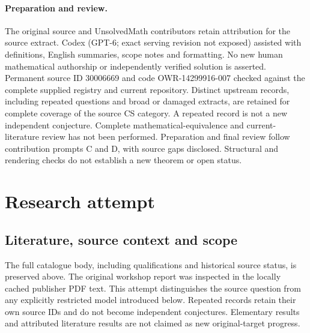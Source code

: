 \documentclass[11pt]{article}
\begin{document}
\paragraph{Preparation and review.}
The original source and UnsolvedMath contributors retain attribution for the source extract. Codex (GPT-6; exact serving revision not exposed) assisted with definitions, English summaries, scope notes and formatting. No new human mathematical authorship or independently verified solution is asserted. Permanent source ID 30006669 and code OWR-14299916-007 checked against the complete supplied registry and current repository. Distinct upstream records, including repeated questions and broad or damaged extracts, are retained for complete coverage of the source CS category. A repeated record is not a new independent conjecture. Complete mathematical-equivalence and current-literature review has not been performed. Preparation and final review follow contribution prompts C and D, with source gaps disclosed. Structural and rendering checks do not establish a new theorem or open status.
\label{end:30006669}

\section{Research attempt}
\subsection{Literature, source context and scope}
The full catalogue body, including qualifications and historical source status, is preserved above. The original workshop report was inspected in the locally cached publisher PDF text. This attempt distinguishes the source question from any explicitly restricted model introduced below. Repeated records retain their own source IDs and do not become independent conjectures. Elementary results and attributed literature results are not claimed as new original-target progress.
\end{document}

